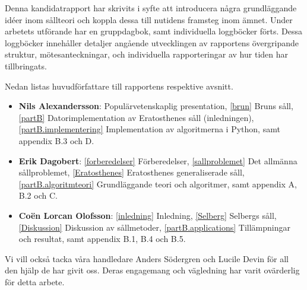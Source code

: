 Denna kandidatrapport har skrivits i syfte att introducera några grundläggande idéer inom sållteori och koppla dessa till nutidens framsteg inom ämnet.
Under arbetets utförande har en gruppdagbok, samt individuella loggböcker förts.
Dessa loggböcker innehåller detaljer angående utvecklingen av rapportens övergripande struktur, mötesanteckningar, och individuella rapporteringar av hur tiden har tillbringats.

Nedan listas huvudförfattare till rapportens respektive avsnitt.
\begin{itemize}
    \item \textbf{Nils Alexandersson}: 
        Populärvetenskaplig presentation,
        \ref{brun} Bruns såll,
        \ref{partB} Datorimplementation av Eratosthenes såll (inledningen),
        \ref{partB.implementering} Implementation av algoritmerna i Python,
        samt appendix B.3 och D.
    \item \textbf{Erik Dagobert}: 
        \ref{forberedelser} Förberedelser, 
        \ref{sallproblemet} Det allmänna sållproblemet, 
        \ref{Eratosthenes} Eratosthenes generaliserade såll,
        \ref{partB.algoritmteori} Grundläggande teori och algoritmer,
        samt appendix A, B.2 och C.
    \item \textbf{Coën Lorcan Olofsson}:
        \ref{inledning} Inledning, 
        \ref{Selberg} Selbergs såll,
        \ref{Diskussion} Diskussion av sållmetoder,
        \ref{partB.applications} Tillämpningar och resultat,
        samt appendix B.1, B.4 och B.5.
\end{itemize}
Vi vill också tacka våra handledare Anders Södergren och Lucile Devin för all den hjälp de har givit oss. 
Deras engagemang och vägledning har varit ovärderlig för detta arbete.